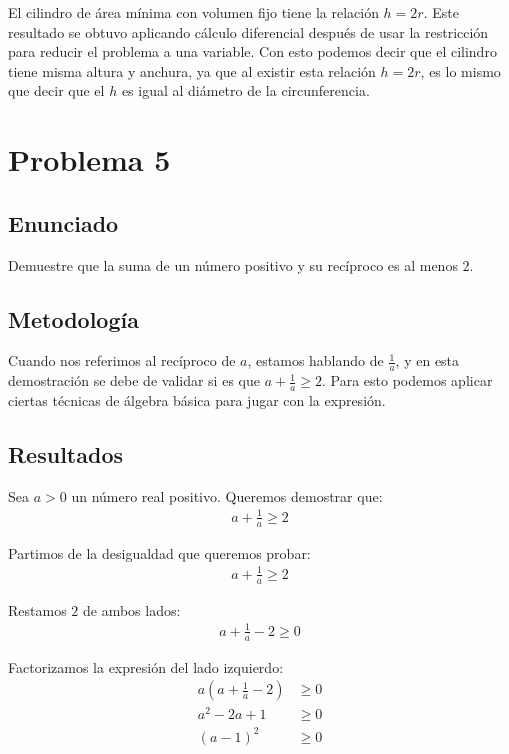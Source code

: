 \documentclass{article}
\begin{document}
El cilindro de área mínima con volumen fijo tiene la relación $h = 2r$. Este resultado se obtuvo aplicando cálculo diferencial después de usar la restricción para reducir el problema a una variable. Con esto podemos decir que el cilindro tiene misma altura y anchura, ya que al existir esta relación $h = 2r$, es lo mismo que decir que el $h$ es igual al diámetro de la circunferencia.

\section{Problema 5}

\subsection{Enunciado}
Demuestre que la suma de un número positivo y su recíproco es al menos $2$.

\subsection{Metodología}

Cuando nos referimos al recíproco de $a$, estamos hablando de $\frac{1}{a}$, y en esta demostración se debe de validar si es que $a + \frac{1}{a} \geq 2$. Para esto podemos aplicar ciertas técnicas de álgebra básica para jugar con la expresión.

\subsection{Resultados}
\setcounter{equation}{0}

Sea $a > 0$ un número real positivo. Queremos demostrar que:
\begin{align}
a + \frac{1}{a} \geq 2
\end{align}

Partimos de la desigualdad que queremos probar:
\begin{align}
a + \frac{1}{a} \geq 2
\end{align}

Restamos $2$ de ambos lados:
\begin{align}
a + \frac{1}{a} - 2 \geq 0
\end{align}

Factorizamos la expresión del lado izquierdo:
\begin{align}
a\left(a + \frac{1}{a} - 2\right) &\geq 0 \\
a^2 - 2a + 1 &\geq 0 \\
(a - 1)^2 &\geq 0
\end{align}
\end{document}
